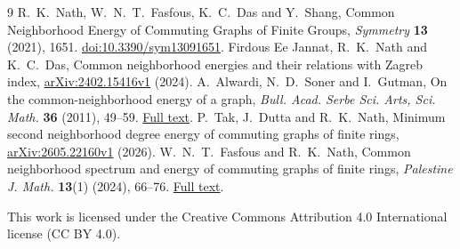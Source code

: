 \documentclass[11pt]{article}
\begin{document}
\begin{thebibliography}{9}
 R.~K.~Nath, W.~N.~T.~Fasfous, K.~C.~Das and Y.~Shang,
Common Neighborhood Energy of Commuting Graphs of Finite Groups,
\emph{Symmetry} \textbf{13} (2021), 1651.
\href{https://doi.org/10.3390/sym13091651}{doi:10.3390/sym13091651}.
 Firdous Ee Jannat, R.~K.~Nath and K.~C.~Das,
Common neighborhood energies and their relations with Zagreb index,
\href{https://arxiv.org/abs/2402.15416v1}{arXiv:2402.15416v1} (2024).
 A.~Alwardi, N.~D.~Soner and I.~Gutman,
On the common-neighborhood energy of a graph,
\emph{Bull. Acad. Serbe Sci. Arts, Sci. Math.} \textbf{36} (2011), 49--59.
\href{https://www.maths.tcd.ie/EMIS/journals/BSANU/36/r4.pdf}{Full text}.
 P.~Tak, J.~Dutta and R.~K.~Nath,
Minimum second neighborhood degree energy of commuting graphs of finite rings,
\href{https://arxiv.org/abs/2605.22160v1}{arXiv:2605.22160v1} (2026).
 W.~N.~T.~Fasfous and R.~K.~Nath,
Common neighborhood spectrum and energy of commuting graphs of finite rings,
\emph{Palestine J. Math.} \textbf{13}(1) (2024), 66--76.
\href{https://pjm.ppu.edu/sites/default/files/papers/PJM_13\%281\%29_2024_66_to_76.pdf}{Full text}.
\end{thebibliography}
\medskip
\noindent\small This work is licensed under the Creative Commons Attribution 4.0
International license (CC BY 4.0).
\end{document}
